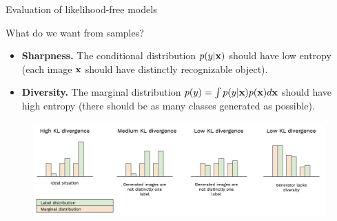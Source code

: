 \begin{frame}{Evaluation of likelihood-free models}
	\begin{block}{What do we want from samples?}
		\begin{itemize}
			\item \textbf{Sharpness.}
			The conditional distribution $p(y | \mathbf{x})$ should have low entropy (each image $\mathbf{x}$ should have distinctly recognizable object).
			\item \textbf{Diversity.}
			The marginal distribution $p(y) = \int p(y | \mathbf{x}) p(\mathbf{x}) d \mathbf{x}$ should have high entropy (there should be as many classes generated as possible).
		\end{itemize}
	\end{block}
	\begin{figure}
		\centering
		\includegraphics[width=1.0\linewidth]{figs/is_toy}
	\end{figure}
\end{frame}
